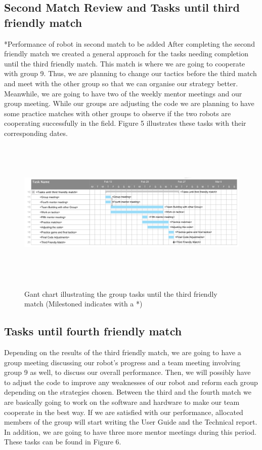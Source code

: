 \documentclass{article}
\begin{document}
\subsection{Second Match Review and Tasks until third friendly match}
*Performance of robot in second match to be added After completing the second
friendly match we created a general approach for the tasks needing completion
until the third friendly match. This match is where we are going to cooperate
with group 9. Thus, we are planning to change our tactics before the third match
and meet with the other group so that we can organise our strategy better.
Meanwhile, we are going to have two of the weekly mentor meetings and our group
meeting. While our groups are adjusting the code we are planning to have some
practice matches with other groups to observe if the two robots are cooperating
successfully in the field. Figure 5 illustrates these tasks with their
corresponding dates.
\begin{figure}[H]
	\centering
	\begin{minipage}{1\textwidth}
		\centering
		\includegraphics[width=16cm, height=7cm]{ThirdFriendlyMatch.png}\\
		\caption{Gant chart illustrating the group tasks until the third friendly match (Milestoned indicates with a *)}
	\end{minipage}%
\end{figure}

\subsection{Tasks until fourth friendly match}
Depending on the results of the third friendly match, we are going to have a
group meeting discussing our robot's progress and a team meeting involving group
9 as well, to discuss our overall performance. Then, we will possibly have to
adjust the code to improve any weaknesses of our robot and reform each group
depending on the strategies chosen. Between the third and the fourth match we
are basically going to work on the software and hardware to make our team
cooperate in the best way. If we are satisfied with our performance, allocated
members of the group will start writing the User Guide and the Technical report.
In addition, we are going to have three more mentor meetings during this period.
These tasks can be found in Figure 6.
\end{document}
